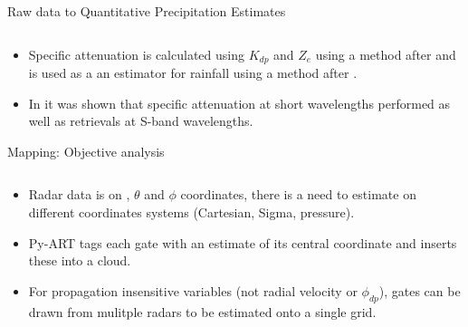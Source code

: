\documentclass[final]{beamer}
\begin{document}
\begin{frame}{}
\begin{columns}[t]
\begin{column}{.3\linewidth}
\begin{block}{Raw data to Quantitative Precipitation Estimates}
\begin{columns}[t]
\begin{column}{.62\linewidth}
\begin{columns}[t]
\begin{column}{.5\linewidth}
		\end{column}
		\end{columns}
 		\end{column}
	\end{columns}
	\begin{itemize}
	\item Specific attenuation is calculated using {\small $K_{dp}$} and {\small $Z_e$} using a method after \citet{gu_polarimetric_2011} and is used as a an estimator for rainfall 
		using a method after \cite{ryzhkov_potential_2014}.
	\item In \citet{giangrande_precipitation_2014} it was shown that specific attenuation at short wavelengths performed as well as retrievals at S-band wavelengths.
	\end{itemize}
      \end{block}
      
      
       \begin{block}{Mapping: Objective analysis}
       \begin{columns}[t]
		\begin{column}{.5\linewidth}
		\begin{itemize}
		\item Radar data is on , $\theta$ and $\phi$ coordinates, there is a need to estimate on different coordinates systems (Cartesian, Sigma, pressure).
		\item Py-ART tags each gate with an estimate of its central coordinate and inserts these into a cloud. 
		\item For propagation insensitive variables (not radial velocity or $\phi_{dp}$), gates can be drawn from mulitple radars to be estimated onto a single grid. 
		

\end{itemize}
\end{column}
\end{columns}
\end{block}
\end{column}
\end{columns}
\end{frame}
\end{document}
